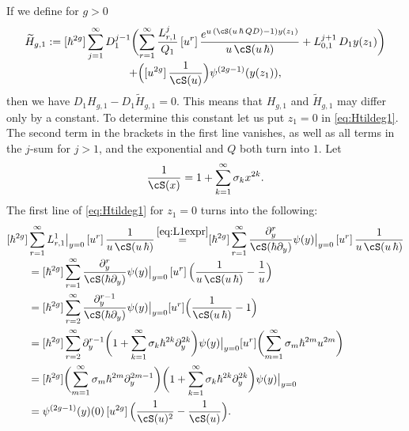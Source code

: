 If we define for $g>0$\vspace*{-5pt}
\begin{multline}\label{eq:Htildeg1}
\widetilde H_{g,1} :=[\hbar^{2g}]\sum_{j=1}^\infty D_1^{j-1} \biggl(\sum_{r=1}^\infty\frac{L_{r,1}^j}{Q_1}
\,[u^r]\, \frac{e^{u\,(\cS(u\,\hbar\,Q D)-1)y(z_1)}}{u\,\cS(u\,\hbar)}+L_{0,1}^{j+1}\, D_1y(z_1) \biggr)
\\[-3pt]
+\Bigl([u^{2g}]\,\frac1{\cS(u)}\Bigr) \psi^{(2g-1)}(y(z_1)),
\end{multline}
then we have $D_1H_{g,1}-D_1\widetilde H_{g,1}=0$. This means that $H_{g,1}$ and $\widetilde H_{g,1}$ may differ only by a constant. To determine this constant let us put $z_1=0$ in \eqref{eq:Htildeg1}. The second term in the brackets in the first line vanishes, as well as all terms in the $j$-sum for $j>1$, and the exponential and $Q$ both turn into $1$.
Let\vspace*{-5pt}
\begin{equation*}
\dfrac{1}{\cS(x)}=1+\sum_{k=1}^\infty \sigma_k x^{2k}.
\end{equation*}
The first line of \eqref{eq:Htildeg1} for $z_1=0$ turns into the following:\vspace*{-5pt}
\begin{align*}
&[\hbar^{2g}]\sum_{r=1}^\infty L_{r,1}^1\big|_{y=0}
\,[u^r]\, \frac{1}{u\,\cS(u\,\hbar)}\mathop{=}^{\eqref{eq:L1expr}}[\hbar^{2g}]\sum_{r=1}^\infty \frac{\partial_{y}^r}{\cS(\hbar \partial_{y})}\psi(y)\big|_{y=0} \,[u^r]\, \frac{1}{u\,\cS(u\,\hbar)} \\[-3pt]
&\qquad =[\hbar^{2g}]\sum_{r=1}^\infty \frac{\partial_{y}^r}{\cS(\hbar \partial_{y})}\psi(y)\big|_{y=0} \,[u^r]\, \Bigl(\frac{1}{u\,\cS(u\,\hbar)}-\dfrac{1}{u} \Bigr)\\
&\qquad =[\hbar^{2g}]\sum_{r=2}^\infty \frac{\partial_{y}^{r-1}}{\cS(\hbar \partial_{y})}\psi(y)\big|_{y=0} [u^{r}] \Bigl(\frac{1}{\cS(u\,\hbar)}-1 \Bigr)\\
&\qquad =[\hbar^{2g}]\sum_{r=2}^\infty \partial_{y}^{r-1}\biggl(1+\sum_{k=1}^\infty \sigma_k \hbar^{2k}\partial_y^{2k} \biggr)\psi(y)\big|_{y=0} [u^{r}] \biggl(\sum_{m=1}^\infty \sigma_m \hbar^{2m}u^{2m} \biggr)\\
&\qquad =[\hbar^{2g}] \biggl(\sum_{m=1}^\infty \sigma_m \hbar^{2m}\partial_y^{2m-1} \biggr) \biggl(1+\sum_{k=1}^\infty \sigma_k \hbar^{2k}\partial_y^{2k} \biggr)\psi(y)\big|_{y=0}\\
&\qquad =\psi^{(2g-1)}(y)(0)\,[u^{2g}]\,\Bigl(\dfrac{1}{\cS(u)^2}-\dfrac{1}{\cS(u)}\Bigr).
\end{align*}
